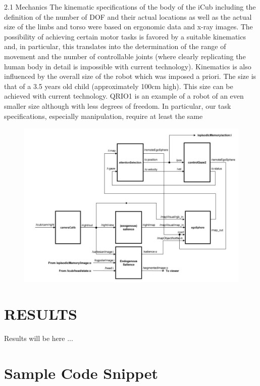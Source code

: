 \documentclass[a4paper, 12pt]{report}
\begin{document}
  2.1 Mechanics
  The kinematic specifications of the body of the iCub including the definition 
  of the number of DOF and their actual locations as well as the actual size of 
  the limbs and torso were based on ergonomic data and x-ray images.
  The possibility of achieving certain motor tasks is favored by a suitable 
  kinematics and, in particular, this translates into the determination of the 
  range of movement and the number of controllable joints (where clearly 
  replicating the human body in detail is impossible with current technology). 
  Kinematics is also influenced by the overall size of the robot which was 
  imposed a priori. The size is that of a 3.5 years old child (approximately 
  100cm high). This size can be achieved with current technology. QRIO1 is an 
  example of a robot of an even smaller size although with less degrees of 
  freedom. In particular, our task specifications, especially manipulation, 
  require at least the same
  
  
  \begin{figure}[h!]
    \centering
    \includegraphics[width=0.9\linewidth]{cognitive_architecture_A}
    \caption{}
    \label{fig:cognitive_architecture_A}
  \end{figure}
  
  
  \chapter{RESULTS}
  
  Results will be here ...
  
  \appendix
  \chapter{Sample Code Snippet}
  
\end{document}
